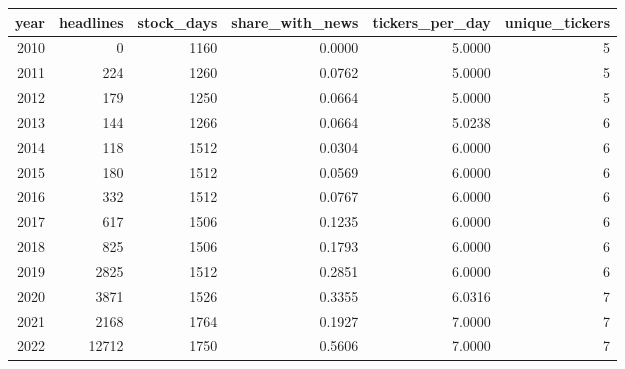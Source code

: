 \begin{tabular}{rrrrrr}
\toprule
year & headlines & stock\_days & share\_with\_news & tickers\_per\_day & unique\_tickers \\
\midrule
2010 & 0 & 1160 & 0.0000 & 5.0000 & 5 \\
2011 & 224 & 1260 & 0.0762 & 5.0000 & 5 \\
2012 & 179 & 1250 & 0.0664 & 5.0000 & 5 \\
2013 & 144 & 1266 & 0.0664 & 5.0238 & 6 \\
2014 & 118 & 1512 & 0.0304 & 6.0000 & 6 \\
2015 & 180 & 1512 & 0.0569 & 6.0000 & 6 \\
2016 & 332 & 1512 & 0.0767 & 6.0000 & 6 \\
2017 & 617 & 1506 & 0.1235 & 6.0000 & 6 \\
2018 & 825 & 1506 & 0.1793 & 6.0000 & 6 \\
2019 & 2825 & 1512 & 0.2851 & 6.0000 & 6 \\
2020 & 3871 & 1526 & 0.3355 & 6.0316 & 7 \\
2021 & 2168 & 1764 & 0.1927 & 7.0000 & 7 \\
2022 & 12712 & 1750 & 0.5606 & 7.0000 & 7 \\
\bottomrule
\end{tabular}
